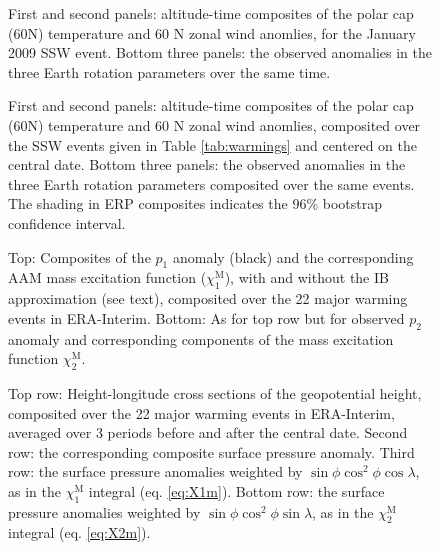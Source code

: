 \documentclass[draft,jgrga]{agutex}
\begin{document}
\begin{figure} 
   \caption{First and second panels: altitude-time composites of the polar cap (60\degree N) temperature and 60 \degree N zonal wind anomlies, for the January 2009 SSW event.  Bottom three panels: the observed anomalies in the three Earth rotation parameters over the same time. }  
   \label{fig:2009event}
 \end{figure}


\begin{figure} 
   \caption{First and second panels: altitude-time composites of the polar cap (60\degree N) temperature and 60 \degree N zonal wind anomlies, composited over the SSW events given in Table \ref{tab:warmings} and centered on the central date.  Bottom three panels: the observed anomalies in the three Earth rotation parameters composited over the same events.  The shading in ERP composites indicates the 96$\%$ bootstrap confidence interval.}
   \label{fig:summary}
 \end{figure}

\begin{figure}
  \noindent
   \caption{Top: Composites of the $p_1$ anomaly (black) and the corresponding AAM mass excitation function  ($\chi_1^{\text{M}}$), with and without the IB approximation (see text), composited over  {the 22 major warming events in ERA-Interim}.   Bottom: As for top row but for observed $p_2$ anomaly and corresponding components of the mass excitation function $\chi_2^{\text{M}}$.}
   \label{fig:composites_X12}
 \end{figure}


\begin{figure}
  \noindent
   \caption{Top row: Height-longitude cross sections of the geopotential height, composited over  {the 22 major warming events in ERA-Interim},  averaged over 3 periods before and after the central date.  Second row: the corresponding composite surface pressure anomaly.  {Third} row: the surface pressure anomalies weighted by  $\sin \phi \cos^2 \phi \cos \lambda$, as in the $\chi_1^{\text{M}}$ integral  (eq. \ref{eq:X1m}).  Bottom row: the surface pressure anomalies weighted by  $\sin \phi \cos^2 \phi \sin \lambda$, as in the $\chi_2^{\text{M}}$ integral (eq. \ref{eq:X2m}).
}
   \label{fig:EGPH_mass_aam}
 \end{figure}
\end{document}
